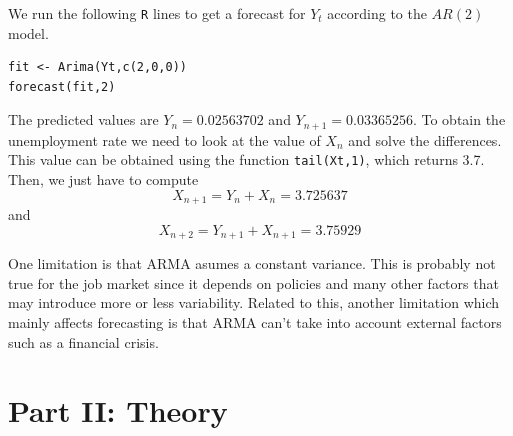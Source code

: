 \documentclass{article}
\theoremstyle{plain}
\theoremstyle{definition}
\newenvironment{exercise}[1]
  {\renewcommand\theexerciseaux{#1}\exerciseaux\label{ejer:#1}}
  {\endexerciseaux}
\newenvironment{sol}{\begin{trivlist}
 \item[\hskip \labelsep {\textit{Solution}.}\hskip \labelsep]}{\end{trivlist}}
\begin{document}
\begin{sol}
We run the following \texttt{R} lines to get a forecast for $Y_t$ according to the $AR(2)$ model.
\lstset{language=R,
showstringspaces=false,
tab=\rightarrowfill}
\begin{lstlisting}
fit <- Arima(Yt,c(2,0,0))
forecast(fit,2)
\end{lstlisting}
The predicted values are $Y_n=0.02563702$ and $Y_{n+1}= 0.03365256$. To obtain the unemployment rate we need to look at the value of $X_n$ and solve the differences. This value can be obtained using the function \texttt{tail(Xt,1)}, which returns 3.7. Then, we just have to compute
\[X_{n+1} = Y_n+X_n = 3.725637\]
and
\[
X_{n+2} = Y_{n+1} + X_{n+1} = 3.75929
\]
\end{sol}
\begin{exercise}{10}
\end{exercise}
\begin{sol}
One limitation is that ARMA asumes a constant variance. This is probably not true for the job market since it depends on policies and many other factors that may introduce more or less variability. Related to this, another limitation which mainly affects forecasting is that ARMA can't take into account external factors such as a financial crisis. 
\end{sol}

\section{Part II: Theory}
\end{document}
